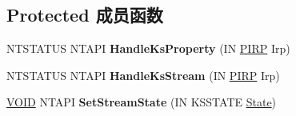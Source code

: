 \subsection*{Protected 成员函数}
\begin{DoxyCompactItemize}
\item 
\mbox{\label{class_c_port_pin_wave_r_t_afe6fd4c1d78feb6ee1c797da842c973c}} 
N\+T\+S\+T\+A\+T\+US N\+T\+A\+PI {\bfseries Handle\+Ks\+Property} (IN \hyperlink{interfacevoid}{P\+I\+RP} Irp)
\item 
\mbox{\label{class_c_port_pin_wave_r_t_a5ef4b5993d0bfc11be4b4a036b1030de}} 
N\+T\+S\+T\+A\+T\+US N\+T\+A\+PI {\bfseries Handle\+Ks\+Stream} (IN \hyperlink{interfacevoid}{P\+I\+RP} Irp)
\item 
\mbox{\label{class_c_port_pin_wave_r_t_abcdb4bd5e49361ede5491c5e6a61bcb8}} 
\hyperlink{interfacevoid}{V\+O\+ID} N\+T\+A\+PI {\bfseries Set\+Stream\+State} (IN K\+S\+S\+T\+A\+TE \hyperlink{struct_state}{State})
\end{DoxyCompactItemize}
